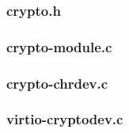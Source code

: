 \documentclass[12pt,titlepage]{article}
\begin{document}
\subsubsection{crypto.h}



\subsubsection{crypto-module.c}



\subsubsection{crypto-chrdev.c}



\subsubsection{virtio-cryptodev.c}



\greektext
\end{document}
